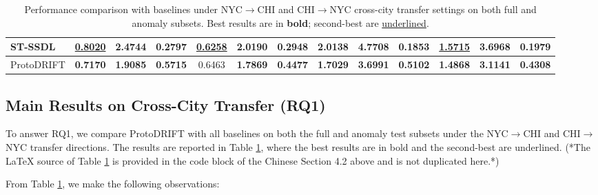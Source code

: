 \begin{table}[htbp]
\begin{tabular}{l|ccc|ccc|ccc|ccc}
ST-SSDL    & \underline{0.8020} & 2.4744 & 0.2797 & \underline{0.6258} & 2.0190 & 0.2948 & 2.0138 & 4.7708 & 0.1853 & \underline{1.5715} & 3.6968 & 0.1979 \\
\midrule
ProtoDRIFT & \textbf{0.7170} & \textbf{1.9085} & \textbf{0.5715} & 0.6463 & \textbf{1.7869} & \textbf{0.4477} & \textbf{1.7029} & \textbf{3.6991} & \textbf{0.5102} & \textbf{1.4868} & \textbf{3.1141} & \textbf{0.4308} \\
\bottomrule
\end{tabular}
\caption{Performance comparison with baselines under NYC$\rightarrow$CHI and CHI$\rightarrow$NYC cross-city transfer settings on both full and anomaly subsets. Best results are in \textbf{bold}; second-best are \underline{underlined}.}
\label{tab:main_cross_city}
\end{table}

\subsection{Main Results on Cross-City Transfer (RQ1)}

To answer RQ1, we compare ProtoDRIFT with all baselines on both the full and anomaly test subsets under the NYC$\rightarrow$CHI and CHI$\rightarrow$NYC transfer directions. The results are reported in Table \ref{tab:main_cross_city}, where the best results are in bold and the second-best are underlined. (*The LaTeX source of Table \ref{tab:main_cross_city} is provided in the code block of the Chinese Section 4.2 above and is not duplicated here.*)

From Table \ref{tab:main_cross_city}, we make the following observations:

